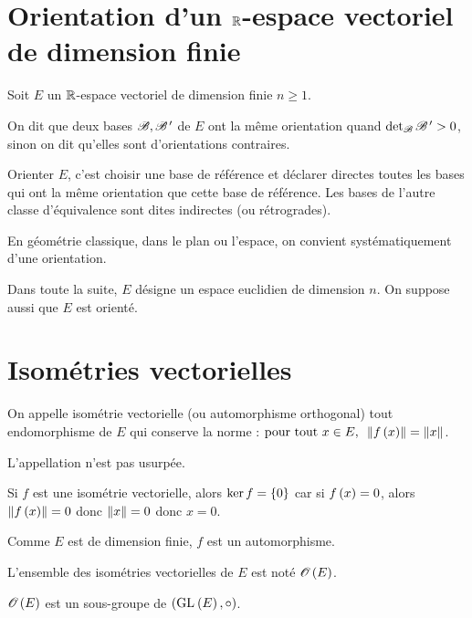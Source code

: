 \section{Orientation d'un \(\mathbb{R}\)-espace vectoriel de dimension finie}

Soit \(E\) un \(\mathbb{R}\)-espace vectoriel de dimension finie \(n\geq1\).

\begin{defi}
On dit que deux bases \(\mathscr{B},\mathscr{B}^{\,\prime}\) de \(E\) ont la même orientation quand \(\detb\fami{B}\prim>0\), sinon on dit qu'elles sont d'orientations contraires.
\end{defi}

Orienter \(E\), c'est choisir une base de référence et déclarer directes toutes les bases qui ont la même orientation que cette base de référence. Les bases de l'autre classe d'équivalence sont dites indirectes (ou rétrogrades).

En géométrie classique, dans le plan ou l'espace, on convient systématiquement d'une orientation.

Dans toute la suite, \(E\) désigne un espace euclidien de dimension \(n\). On suppose aussi que \(E\) est orienté.

\section{Isométries vectorielles}

\begin{defi}
On appelle isométrie vectorielle (ou automorphisme orthogonal) tout endomorphisme de \(E\) qui conserve la norme : \(\quantifs{\tpt x\in E}\norme{f\paren{x}}=\norme{x}\).
\end{defi}

\begin{rem}
L'appellation  n'est pas usurpée.
\end{rem}

\begin{dem}
Si \(f\) est une isométrie vectorielle, alors \(\ker f=\left\lbrace0\right\rbrace\) car si \(f\left(x\right)=0\), alors \(\norme{f\paren{x}}=0\) donc \(\norme{x}=0\) donc \(x=0\).

Comme \(E\) est de dimension finie, \(f\) est un automorphisme.
\end{dem}

L'ensemble des isométries vectorielles de \(E\) est noté \(\Orth{}[E]\).

\begin{prop}
\(\Orth{}[E]\) est un sous-groupe de \(\groupe{\GL{}[E]}[\rond]\).
\end{prop}

